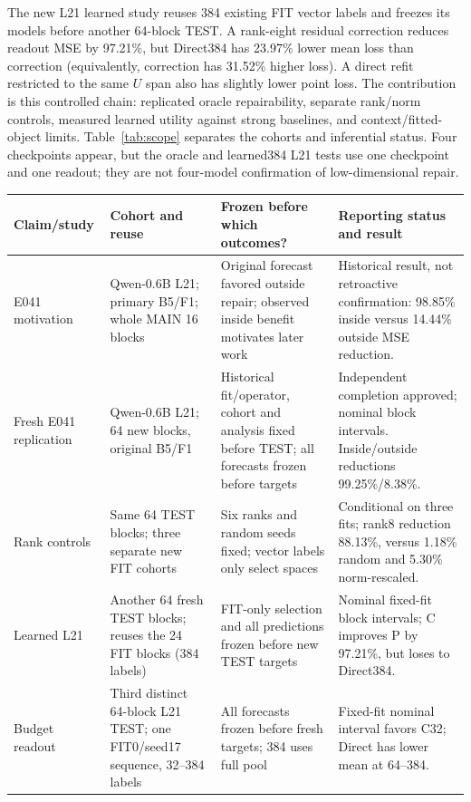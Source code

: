 The new L21 learned study reuses 384 existing FIT vector labels and freezes its models before another 64-block TEST. A rank-eight residual correction reduces readout MSE by 97.21\%, but Direct384 has 23.97\% lower mean loss than correction (equivalently, correction has 31.52\% higher loss). A direct refit restricted to the same $U$ span also has slightly lower point loss. The contribution is this controlled chain: replicated oracle repairability, separate rank/norm controls, measured learned utility against strong baselines, and context/fitted-object limits. Table~\ref{tab:scope} separates the cohorts and inferential status. Four checkpoints appear, but the oracle and learned384 L21 tests use one checkpoint and one readout; they are not four-model confirmation of low-dimensional repair.
\begin{table}[ht]
\centering\scriptsize\setlength{\tabcolsep}{4pt}
\begin{tabular}{>{\raggedright\arraybackslash}p{}>{\raggedright\arraybackslash}p{}>{\raggedright\arraybackslash}p{}>{\raggedright\arraybackslash}p{}}
\toprule Claim/study & Cohort and reuse & Frozen before which outcomes? & Reporting status and result\\\midrule
E041 motivation & Qwen-0.6B L21; primary B5/F1; whole MAIN 16 blocks & Original forecast favored outside repair; observed inside benefit motivates later work & Historical result, not retroactive confirmation: 98.85\% inside versus 14.44\% outside MSE reduction.\\[3pt]
Fresh E041 replication & Qwen-0.6B L21; 64 new blocks, original B5/F1 & Historical fit/operator, cohort and analysis fixed before TEST; all forecasts frozen before targets & Independent completion approved; nominal block intervals. Inside/outside reductions 99.25\%/8.38\%.\\[3pt]
Rank controls & Same 64 TEST blocks; three separate new FIT cohorts & Six ranks and random seeds fixed; vector labels only select spaces & Conditional on three fits; rank8 reduction 88.13\%, versus 1.18\% random and 5.30\% norm-rescaled.\\[3pt]
Learned L21 & Another 64 fresh TEST blocks; reuses the 24 FIT blocks (384 labels) & FIT-only selection and all predictions frozen before new TEST targets & Nominal fixed-fit block intervals; C improves P by 97.21\%, but loses to Direct384.\\[3pt]
Budget readout & Third distinct 64-block L21 TEST; one FIT0/seed17 sequence, 32--384 labels & All forecasts frozen before fresh targets; 384 uses full pool & Fixed-fit nominal interval favors C32; Direct has lower mean at 64--384.\\[3pt]

\end{tabular}
\end{table}
